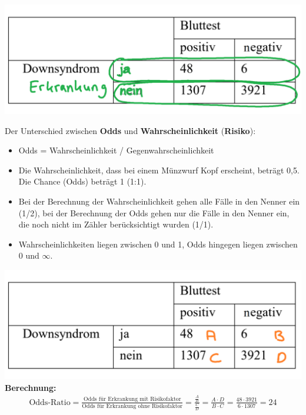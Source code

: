 \documentclass[t,11pt,aspectratio=169]{beamer}
\begin{document}
\begin{frame}
\begin{center}
\includegraphics[width=\textwidth]{tabelle3.png}
\end{center}
\end{frame}

\begin{frame}
Der Unterschied zwischen \textbf{Odds} und \textbf{Wahrscheinlichkeit} (\textbf{Risiko}):
\begin{itemize}
	\item Odds = Wahrscheinlichkeit / Gegenwahrscheinlichkeit
	\item Die Wahrscheinlichkeit, dass bei einem Münzwurf Kopf erscheint, beträgt 0,5. Die Chance (Odds) beträgt 1 (1:1). 
	\item Bei der Berechnung der Wahrscheinlichkeit gehen alle Fälle in den Nenner ein (1/2), bei der Berechnung der Odds gehen nur die Fälle in den Nenner ein, die noch nicht im Zähler berücksichtigt wurden (1/1).
	\item Wahrscheinlichkeiten liegen zwischen 0 und 1, Odds hingegen liegen zwischen 0 und $\infty$.
\end{itemize}
\end{frame}

\begin{frame}
\includegraphics[width=\textwidth]{tabelle4.png}
\vfill
\textbf{Berechnung:}
\begin{align*}
\text{Odds-Ratio} = \frac{\text{Odds für Erkrankung mit Risikofaktor}}{\text{Odds für Erkrankung ohne Risikofaktor}} = \frac{\frac{A}{B}}{\frac{C}{D}} = \frac{A\cdot D}{B \cdot C} = \frac{48\cdot 3921}{6 \cdot 1307} = 24
\end{align*}
\vfill
\end{frame}
\end{document}
